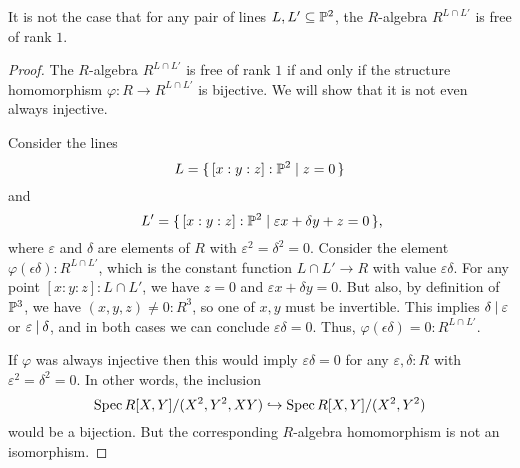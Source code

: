 \begin{example}
  It is not the case that
  for any pair of lines $L, L' \subseteq \mathbb{P}^2$,
  the $R$-algebra $R^{L \cap L'}$ is free of rank $1$.
\end{example}

\begin{proof}
  The $R$-algebra $R^{L \cap L'}$ is free of rank $1$
  if and only if the structure homomorphism
  $\varphi : R \to R^{L \cap L'}$ is bijective.
  We will show that it is not even always injective.

  Consider the lines
  \[ L = \{\, [x : y : z] : \mathbb{P}^2 \mid z = 0 \,\} \]
  and
  \[ L' = \{\, [x : y : z] : \bP^2 \mid \varepsilon x + \delta y + z = 0 \,\}
     \rlap{,} \]
  where $\varepsilon$ and $\delta$ are elements of $R$
  with $\varepsilon^2 = \delta^2 = 0$.
  Consider the element $\varphi(\epsilon \delta) : R^{L \cap L'}$,
  which is the constant function $L \cap L' \to R$
  with value $\varepsilon \delta$.
  For any point $[x : y : z] : L \cap L'$,
  we have $z = 0$ and $\varepsilon x + \delta y = 0$.
  But also, by definition of $\mathbb{P}^3$,
  we have $(x, y, z) \neq 0 : R^3$,
  so one of $x, y$ must be invertible.
  This implies $\delta \mathbin{|} \varepsilon$ or $\varepsilon \mathbin{|} \delta$,
  and in both cases we can conclude $\varepsilon \delta = 0$.
  Thus, $\varphi(\epsilon \delta) = 0 : R^{L \cap L'}$.

  If $\varphi$ was always injective
  then this would imply $\varepsilon \delta = 0$
  for any $\varepsilon, \delta : R$
  with $\varepsilon^2 = \delta^2 = 0$.
  In other words, the inclusion
  \[ \operatorname{Spec} R[X, Y]/(X^2, Y^2, XY) \hookrightarrow \operatorname{Spec} R[X, Y]/(X^2, Y^2) \]
  would be a bijection.
  But the corresponding $R$-algebra homomorphism is not an isomorphism.
\end{proof}
